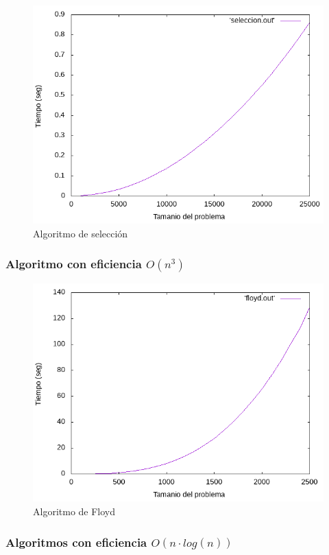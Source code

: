 \documentclass[12pt,spanish]{article}
\begin{document}
\begin{figure}[H]
\centering
\includegraphics[scale=0.75]{empirica_seleccion.png}
\caption{Algoritmo de selección}
\end{figure}
\subsubsection{Algoritmo con eficiencia $O(n^3)$}
\begin{figure}[H]
\centering
\includegraphics[scale=0.75]{empirica_floyd.png}
\caption{Algoritmo de Floyd}
\end{figure}

\subsubsection{Algoritmos con eficiencia $O(n \cdot log(n))$}
\end{document}
